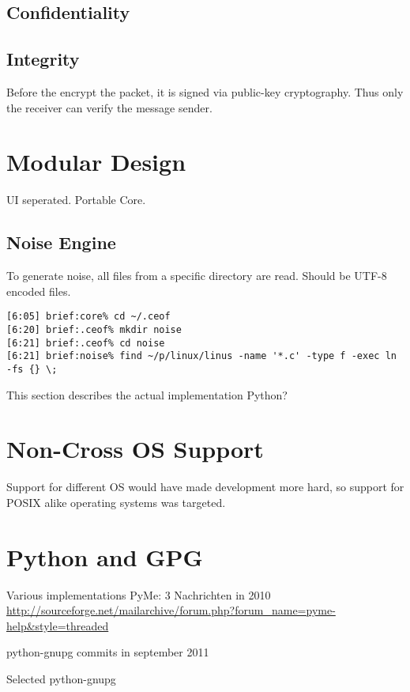 \subsection{Confidentiality}

\subsection{Integrity}
Before the encrypt the packet, it is signed via public-key
cryptography\cite{pgp-1}. Thus only the receiver can verify the message sender.


\section{Modular Design}
UI seperated.
Portable Core.
\subsection{Noise Engine}
To generate noise, all files from a specific directory are read.
Should be UTF-8 encoded files.

\begin{verbatim}
[6:05] brief:core% cd ~/.ceof 
[6:20] brief:.ceof% mkdir noise
[6:21] brief:.ceof% cd noise 
[6:21] brief:noise% find ~/p/linux/linus -name '*.c' -type f -exec ln -fs {} \;
\end{verbatim}

This section describes the actual implementation
Python?
\section{Non-Cross OS Support}
Support for different OS would have made development more
hard, so support for POSIX alike operating systems was targeted.

\section{Python and GPG}
Various implementations \cite{python-gpg}
PyMe: 3 Nachrichten in 2010
\url{http://sourceforge.net/mailarchive/forum.php?forum_name=pyme-help&style=threaded}

python-gnupg commits in september 2011 \cite{python-gnupg}

Selected python-gnupg


